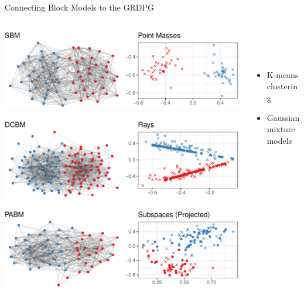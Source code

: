 \documentclass[
  ignorenonframetext,
]{beamer}
\providecommand{\tightlist}{%
  \setlength{\itemsep}{0pt}\setlength{\parskip}{0pt}}
\begin{document}
\begin{frame}{Connecting Block Models to the GRDPG}
\protect\hypertarget{connecting-block-models-to-the-grdpg}{}
\begin{columns}[T]
\begin{column}{0.67\textwidth}
\begin{center}\includegraphics[width=1\linewidth]{slides_files/figure-beamer/unnamed-chunk-5-1} \end{center}

\begin{center}\includegraphics[width=1\linewidth]{slides_files/figure-beamer/unnamed-chunk-6-1} \end{center}

\begin{center}\includegraphics[width=1\linewidth]{slides_files/figure-beamer/unnamed-chunk-7-1} \end{center}
\end{column}

\begin{column}{0.33\textwidth}
~

~

\begin{itemize}
\tightlist
\item
  K-means clustering
\item
  Gaussian mixture models
\end{itemize}


\end{column}
\end{columns}
\end{frame}
\end{document}
